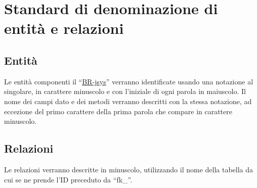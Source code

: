 \section{Standard di denominazione di entit\`a e relazioni}
\subsection{Entit\`a}
Le entit\`a componenti il ``\underline{BR-jsys}'' verranno identificate usando una notazione al singolare, in carattere minuscolo e con l'iniziale di ogni parola in maiuscolo. Il nome dei campi dato e dei metodi verranno descritti con la stessa notazione, ad eccezione del primo carattere della prima parola che compare in carattere minuscolo.
\subsection{Relazioni}
Le relazioni verranno descritte in minuscolo, utilizzando il nome della tabella da cui se ne prende l'ID preceduto da ``fk\_''.



